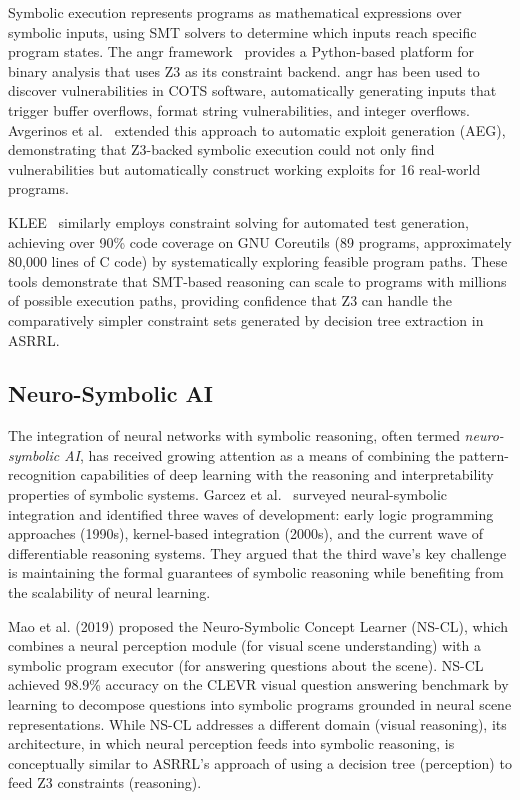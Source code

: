 \documentclass[12pt, letterpaper, oneside]{report}
\newcommand{\ASRRL}{\textsc{ASRRL}}
\begin{document}
Symbolic execution represents programs as mathematical expressions over symbolic inputs, using SMT solvers to determine which inputs reach specific program states. The angr framework~\citep{shoshitaishvili2016} provides a Python-based platform for binary analysis that uses Z3 as its constraint backend. angr has been used to discover vulnerabilities in COTS software, automatically generating inputs that trigger buffer overflows, format string vulnerabilities, and integer overflows. Avgerinos et al.~\citep{avgerinos2014} extended this approach to automatic exploit generation (AEG), demonstrating that Z3-backed symbolic execution could not only find vulnerabilities but automatically construct working exploits for 16 real-world programs.

KLEE~\citep{cadar2008} similarly employs constraint solving for automated test generation, achieving over 90\% code coverage on GNU Coreutils (89 programs, approximately 80,000 lines of C code) by systematically exploring feasible program paths. These tools demonstrate that SMT-based reasoning can scale to programs with millions of possible execution paths, providing confidence that Z3 can handle the comparatively simpler constraint sets generated by decision tree extraction in \ASRRL{}.

\subsection{Neuro-Symbolic AI}

The integration of neural networks with symbolic reasoning, often termed \emph{neuro-symbolic AI}, has received growing attention as a means of combining the pattern-recognition capabilities of deep learning with the reasoning and interpretability properties of symbolic systems. Garcez et al.~\citep{garcez2019} surveyed neural-symbolic integration and identified three waves of development: early logic programming approaches (1990s), kernel-based integration (2000s), and the current wave of differentiable reasoning systems. They argued that the third wave's key challenge is maintaining the formal guarantees of symbolic reasoning while benefiting from the scalability of neural learning.

Mao et al. (2019) proposed the Neuro-Symbolic Concept Learner (NS-CL), which combines a neural perception module (for visual scene understanding) with a symbolic program executor (for answering questions about the scene). NS-CL achieved 98.9\% accuracy on the CLEVR visual question answering benchmark by learning to decompose questions into symbolic programs grounded in neural scene representations. While NS-CL addresses a different domain (visual reasoning), its architecture, in which neural perception feeds into symbolic reasoning, is conceptually similar to \ASRRL{}'s approach of using a decision tree (perception) to feed Z3 constraints (reasoning).
\end{document}
